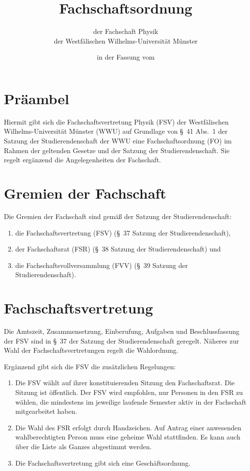 \documentclass[
	a4paper,
	12pt,
	oneside,
	parskip=half-,
	pagesize,
	headsepline,
	german,
	ngerman
]{scrartcl}
\title{Fachschaftsordnung}
\subtitle{der Fachschaft Physik\\
der Westfälischen Wilhelms-Universität Münster}
\date{in der Fassung vom \formatdate{11}{01}{2017}}
\author{}
\begin{document}
\maketitle

\section{Präambel}
Hiermit gibt sich die Fachschaftsvertretung Physik (FSV) der Westfälischen Wilhelms-Universi\-tät Münster (WWU) auf Grundlage von §~41 Abs.~1 der Satzung der Studierendenschaft der WWU eine Fachschaftsordnung (FO) im Rahmen der geltenden Gesetze und der Satzung der Studierendenschaft. Sie regelt ergänzend die Angelegenheiten der Fachschaft.

\setcounter{section}{1}
\section{Gremien der Fachschaft}
Die Gremien der Fachschaft sind gemäß der Satzung der Studierendenschaft:
\begin{enumerate}
	\item die Fachschaftsvertretung (FSV) (§~37 Satzung der Studierendenschaft),
	\item der Fachschaftsrat (FSR) (§~38 Satzung der Studierendenschaft) und 
	\item die Fachschaftsvollversammlung (FVV) (§~39 Satzung der Studierendenschaft).
\end{enumerate}

\section{Fachschaftsvertretung}
Die Amtszeit, Zusammensetzung, Einberufung, Aufgaben und Beschlussfassung der FSV sind in §~37 der Satzung der Studierendenschaft geregelt. Näheres zur Wahl der Fachschaftsvertretungen regelt die Wahlordnung.

Ergänzend gibt sich die FSV die zusätzlichen Regelungen:
\begin{enumerate}
	\item Die FSV wählt auf ihrer konstituierenden Sitzung den Fachschaftsrat. Die Sitzung ist öffentlich. Der FSV wird empfohlen, nur Personen in den FSR zu wählen, die mindestens im jeweilige laufende Semester aktiv in der Fachschaft mitgearbeitet haben.
	\item Die Wahl des FSR erfolgt durch Handzeichen. Auf Antrag einer anwesenden wahlberechtigten Person muss eine geheime Wahl stattfinden. Es kann auch über die Liste als Ganzes abgestimmt werden.
	\item Die Fachschaftsvertretung gibt sich eine Geschäftsordnung.
\end{enumerate}
\end{document}
